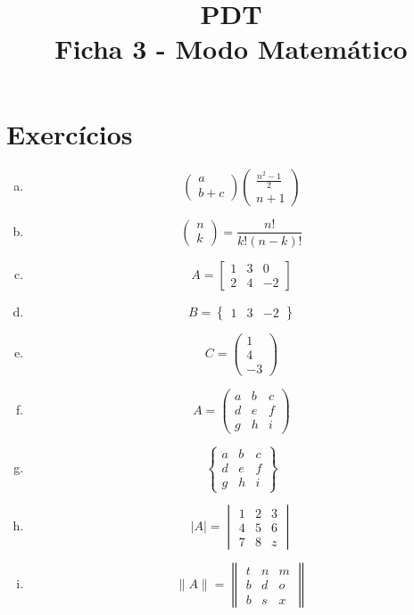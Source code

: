 \documentclass[12pt, a4paper]{article}
\date{}
\title{PDT \\Ficha 3 - Modo Matemático}
\begin{document}
\maketitle
\section{Exercícios}
\begin{enumerate} [a)]
\item $$\begin{pmatrix}
a\\
b+c
\end{pmatrix} \begin{pmatrix}
\frac{n^2-1}{2}\\
n+1
\end{pmatrix} $$
\item $$\begin{pmatrix}
n\\
k
\end{pmatrix} = \frac{n!}{k!(n-k)!} $$
\item $$A = \begin{bmatrix}
1&3&0\\
2&4&-2
\end{bmatrix}$$
\item  $$B = \begin{Bmatrix}
1&3&-2
\end{Bmatrix}$$
\item $$C = \begin{pmatrix}
1\\
4\\
-3
\end{pmatrix}$$
\item $$A = \begin{pmatrix}
a&b&c\\
d&e&f\\
g&h&i
\end{pmatrix}$$
\item $$\begin{Bmatrix}
a&b&c\\
d&e&f\\
g&h&i
\end{Bmatrix}$$
\item $$
\lvert A \rvert
 = \begin{vmatrix}
1&2&3\\
4&5&6\\
7&8&z
\end{vmatrix}$$
\item $$
\lVert A \rVert
 = \begin{Vmatrix}
t&n&m\\
b&d&o\\
b&s&x
\end{Vmatrix}$$
\end{enumerate}
\end{document}
